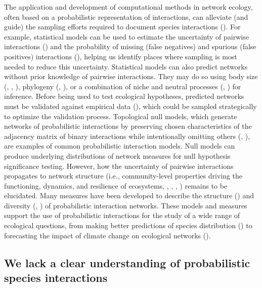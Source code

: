 The application and development of computational methods in network ecology,
often based on a probabilistic representation of interactions, can alleviate
(and guide) the sampling efforts required to document species interactions
(\cite{Strydom2021Roadmapa}). For example, statistical models can be used to
estimate the uncertainty of pairwise interactions
(\cite{Cirtwill2019Quantitative}) and the probability of missing (false
negatives) and spurious (false positives) interactions
(\cite{Guimera2009Missing}), helping us identify places where sampling is most
needed to reduce this uncertainty. Statistical models can also predict networks
without prior knowledge of pairwise interactions. They may do so using body size
(\cite{Petchey2008Size}, \cite{Gravel2013Inferring},
\cite{Caron2024Traitmatching}), phylogeny (\cite{Elmasri2020Hierarchical},
\cite{Strydom2022Food}), or a combination of niche and neutral processes
(\cite{Bartomeus2016Common}, \cite{Pomeranz2019Inferring}) for inference. Before
being used to test ecological hypotheses, predicted networks must be validated
against empirical data (\cite{Brimacombe2024Applying}), which could be sampled
strategically to optimize the validation process. Topological null models, which
generate networks of probabilistic interactions by preserving chosen
characteristics of the adjacency matrix of binary interactions while
intentionally omitting others (\cite{Bascompte2003Nested},
\cite{Fortuna2006Habitat}), are examples of common probabilistic interaction
models. Null models can produce underlying distributions of network measures for
null hypothesis significance testing. However, how the uncertainty of pairwise
interactions propagates to network structure (i.e., community-level properties
driving the functioning, dynamics, and resilience of ecosystems,
\cite{McCann2007Protecting}, \cite{McCann2011Food}, \cite{Proulx2005Network},
\cite{Rooney2012Integrating}) remains to be elucidated. Many measures have been
developed to describe the structure (\cite{Poisot2016Structure}) and diversity
(\cite{Ohlmann2019Diversity}, \cite{Godsoe2022Species}) of probabilistic
interaction networks. These models and measures support the use of probabilistic
interactions for the study of a wide range of ecological questions, from making
better predictions of species distribution (\cite{Cazelles2016Theorya}) to
forecasting the impact of climate change on ecological networks
(\cite{Gilman2010Framework}).

\subsection{We lack a clear understanding of probabilistic species interactions} 


